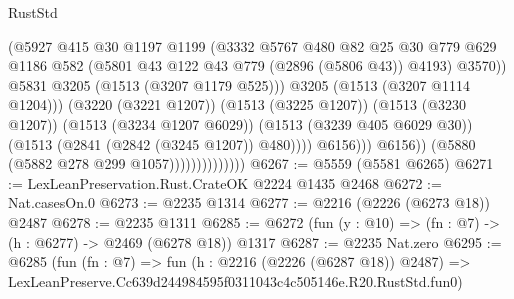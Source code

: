 \begin{lexlean}{RustStd}
\begin{coremodule}
                                              (@5927
                                                @415
                                                @30
                                                @1197
                                                @1199
                                                (@3332
                                                  @5767
                                                  @480
                                                  @82
                                                  @25
                                                  @30
                                                  @779
                                                  @629
                                                  @1186
                                                  @582
                                                  (@5801
                                                    @43
                                                    @122
                                                    @43
                                                    @779
                                                    (@2896 (@5806 @43))
                                                    @4193)
                                                  @3570))
                                              @5831
                                              @3205
                                              (@1513 (@3207 @1179 @525)))
                                            @3205
                                            (@1513 (@3207 @1114 @1204)))
                                          (@3220 (@3221 @1207))
                                          (@1513 (@3225 @1207))
                                          (@1513 (@3230 @1207))
                                          (@1513 (@3234 @1207 @6029))
                                          (@1513 (@3239 @405 @6029 @30))
                                          (@1513 (@2841 (@2842 (@3245 @1207)) @480))))
                                      @6156)))
                                @6156))
                            (@5880 (@5882 @278 @299 @1057))))))))))))))
@6267 := @5559 (@5581 @6265)
@6271 := LexLeanPreservation.Rust.CrateOK @2224 @1435 @2468
@6272 := Nat.casesOn.{0}
@6273 := @2235 @1314
@6277 := @2216 (@2226 (@6273 @18)) @2487
@6278 := @2235 @1311
@6285 := @6272 (fun (y : @10) => (fn : @7) -> (h : @6277) -> @2469 (@6278 @18)) @1317
@6287 := @2235 Nat.zero
@6295 := @6285
    (fun (fn : @7) =>
    fun (h : @2216 (@2226 (@6287 @18)) @2487) =>
    LexLeanPreserve.Cc639d244984595f0311043c4c505146e.R20.RustStd.fun0)

\end{coremodule}
\end{lexlean}
